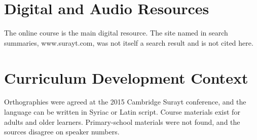 \documentclass[12pt]{article}
\begin{document}
\section{Digital and Audio Resources}
The online course is the main digital resource. The site named in search summaries, www.surayt.com, was not itself a search result and is not cited here.

\section{Curriculum Development Context}
Orthographies were agreed at the 2015 Cambridge Surayt conference, and the language can be written in Syriac or Latin script. Course materials exist for adults and older learners. Primary-school materials were not found, and the sources disagree on speaker numbers.
\end{document}
